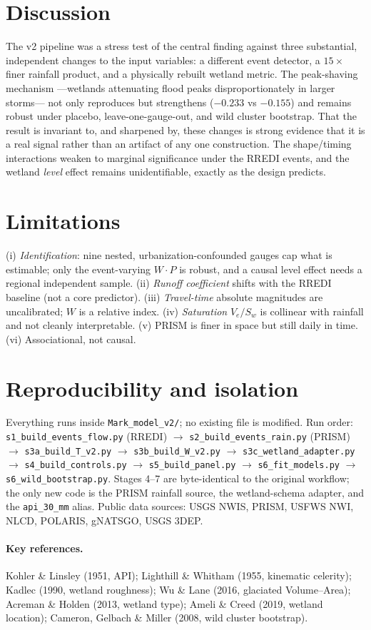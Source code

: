 \documentclass[11pt]{article}
\begin{document}
\section{Discussion}
The v2 pipeline was a stress test of the central finding against three substantial, independent
changes to the input variables: a different event detector, a $15\times$ finer rainfall product,
and a physically rebuilt wetland metric. The peak-shaving mechanism ---wetlands attenuating flood
peaks disproportionately in larger storms--- not only reproduces but strengthens ($-0.233$ vs
$-0.155$) and remains robust under placebo, leave-one-gauge-out, and wild cluster bootstrap. That
the result is invariant to, and sharpened by, these changes is strong evidence that it is a real
signal rather than an artifact of any one construction. The shape/timing interactions weaken to
marginal significance under the RREDI events, and the wetland \emph{level} effect remains
unidentifiable, exactly as the design predicts.

\section{Limitations}
(i) \emph{Identification}: nine nested, urbanization-confounded gauges cap what is estimable; only
the event-varying $W\!\cdot\!P$ is robust, and a causal level effect needs a regional independent
sample. (ii) \emph{Runoff coefficient} shifts with the RREDI baseline (not a core predictor).
(iii) \emph{Travel-time} absolute magnitudes are uncalibrated; $W$ is a relative index.
(iv) \emph{Saturation} $V_e/S_w$ is collinear with rainfall and not cleanly interpretable.
(v) PRISM is finer in space but still daily in time. (vi) Associational, not causal.

\section{Reproducibility and isolation}
Everything runs inside \texttt{Mark\_model\_v2/}; no existing file is modified. Run order:
\texttt{s1\_build\_events\_flow.py} (RREDI) $\rightarrow$ \texttt{s2\_build\_events\_rain.py}
(PRISM) $\rightarrow$ \texttt{s3a\_build\_T\_v2.py} $\rightarrow$ \texttt{s3b\_build\_W\_v2.py}
$\rightarrow$ \texttt{s3c\_wetland\_adapter.py} $\rightarrow$ \texttt{s4\_build\_controls.py}
$\rightarrow$ \texttt{s5\_build\_panel.py} $\rightarrow$ \texttt{s6\_fit\_models.py}
$\rightarrow$ \texttt{s6\_wild\_bootstrap.py}. Stages 4--7 are byte-identical to the original
workflow; the only new code is the PRISM rainfall source, the wetland-schema adapter, and the
\texttt{api\_30\_mm} alias. Public data sources: USGS NWIS, PRISM, USFWS NWI, NLCD, POLARIS,
gNATSGO, USGS 3DEP.

\paragraph{Key references.} Kohler \& Linsley (1951, API); Lighthill \& Whitham (1955, kinematic
celerity); Kadlec (1990, wetland roughness); Wu \& Lane (2016, glaciated Volume--Area); Acreman \&
Holden (2013, wetland type); Ameli \& Creed (2019, wetland location); Cameron, Gelbach \& Miller
(2008, wild cluster bootstrap).
\end{document}
